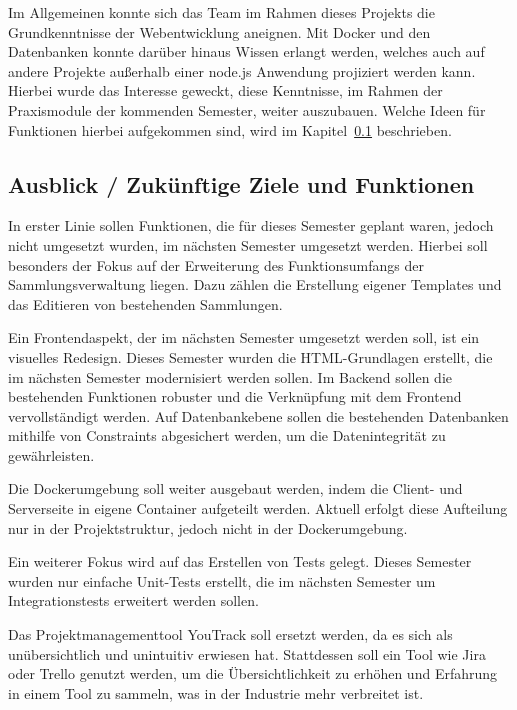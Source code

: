Im Allgemeinen konnte sich das Team im Rahmen dieses Projekts die Grundkenntnisse der Webentwicklung aneignen.
Mit Docker und den Datenbanken konnte darüber hinaus Wissen erlangt werden, welches auch auf andere Projekte außerhalb einer node.js Anwendung projiziert werden kann.
Hierbei wurde das Interesse geweckt, diese Kenntnisse, im Rahmen der Praxismodule der kommenden Semester, weiter auszubauen.
Welche Ideen für Funktionen hierbei aufgekommen sind, wird im Kapitel~\ref{subsec:ausblick-zukuenftige-ziele-und-funktionen} beschrieben.

\subsection{Ausblick / Zukünftige Ziele und Funktionen}\label{subsec:ausblick-zukuenftige-ziele-und-funktionen}

In erster Linie sollen Funktionen, die für dieses Semester geplant waren, jedoch nicht umgesetzt wurden, im nächsten Semester umgesetzt werden.
Hierbei soll besonders der Fokus auf der Erweiterung des Funktionsumfangs der Sammlungsverwaltung liegen.
Dazu zählen die Erstellung eigener Templates und das Editieren von bestehenden Sammlungen.

Ein Frontendaspekt, der im nächsten Semester umgesetzt werden soll, ist ein visuelles Redesign.
Dieses Semester wurden die HTML-Grundlagen erstellt, die im nächsten Semester modernisiert werden sollen.
Im Backend sollen die bestehenden Funktionen robuster und die Verknüpfung mit dem Frontend vervollständigt werden.
Auf Datenbankebene sollen die bestehenden Datenbanken mithilfe von Constraints abgesichert werden, um die Datenintegrität zu gewährleisten.

Die Dockerumgebung soll weiter ausgebaut werden, indem die Client- und Serverseite in eigene Container aufgeteilt werden.
Aktuell erfolgt diese Aufteilung nur in der Projektstruktur, jedoch nicht in der Dockerumgebung.

Ein weiterer Fokus wird auf das Erstellen von Tests gelegt.
Dieses Semester wurden nur einfache Unit-Tests erstellt, die im nächsten Semester um Integrationstests erweitert werden sollen.

Das Projektmanagementtool YouTrack soll ersetzt werden, da es sich als unübersichtlich und unintuitiv erwiesen hat.
Stattdessen soll ein Tool wie Jira oder Trello genutzt werden, um die Übersichtlichkeit zu erhöhen und Erfahrung in einem Tool zu sammeln, was in der Industrie mehr verbreitet ist.